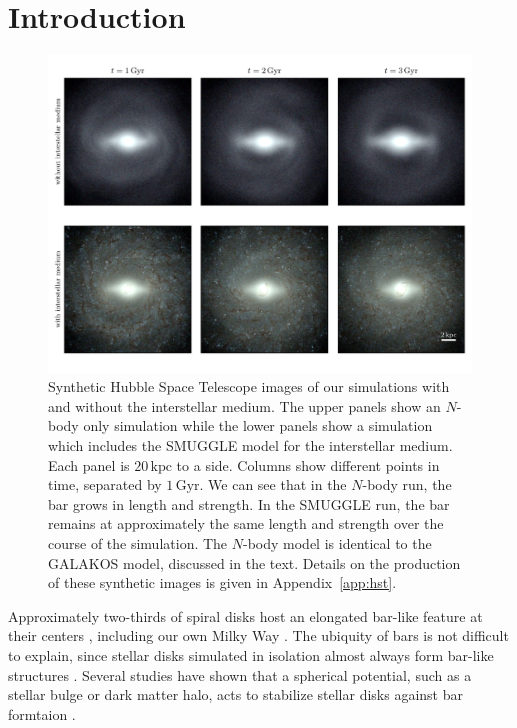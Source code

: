 \documentclass[fleqn,usenatbib]{mnras}
\newcommand{\Nbody}{$N$-body}
\begin{document}
\section{Introduction}
\label{sec:intro}
\begin{figure}
    \centering
    \includegraphics[width=\textwidth]{fig/mockHST.pdf}
    \caption{Synthetic Hubble Space Telescope images of our simulations with and
    without the interstellar medium. The upper panels show an \Nbody{} only
    simulation while the lower panels show a simulation which includes the
    SMUGGLE model for the interstellar medium. Each panel is $20\,\textrm{kpc}$
    to a side. Columns show different points in time, separated by
    $1\,\textrm{Gyr}$. We can see that in the \Nbody{} run, the bar grows in
    length and strength. In the SMUGGLE run, the bar remains at approximately
    the same length and strength over the course of the simulation. The \Nbody{}
    model is identical to the GALAKOS model, discussed in the text. Details on
    the production of these synthetic images is given in Appendix~\ref{app:hst}.}\label{fig:overview}
\end{figure}

Approximately two-thirds of spiral disks host an elongated bar-like feature at
their centers \citep{2000AJ....119..536E, 2007ApJ...657..790M}, including our
own Milky Way \citep{1957AJ.....62...19J, 1991ApJ...379..631B}. The ubiquity of
bars is not difficult to explain, since stellar disks simulated in isolation
almost always form bar-like structures \citep{1971ApJ...168..343H}. Several
studies have shown that a spherical potential, such as a stellar bulge or dark
matter halo, acts to stabilize stellar disks against bar formtaion
\citep[e.g.,][]{1973ApJ...186..467O, 1976AJ.....81...30H}.
\end{document}
